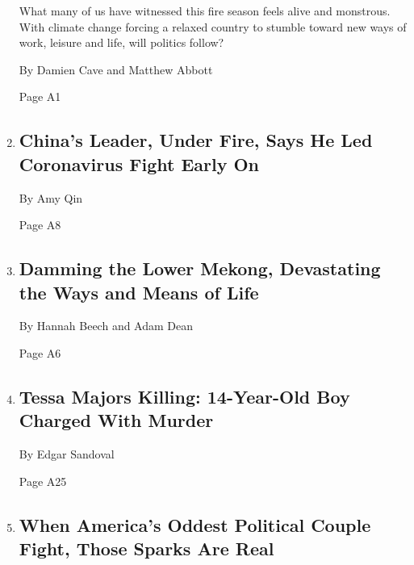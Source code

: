 \begin{enumerate}
  What many of us have witnessed this fire season feels alive and
  monstrous. With climate change forcing a relaxed country to stumble
  toward new ways of work, leisure and life, will politics follow?

  By Damien Cave and Matthew Abbott

  Page A1
\item
  \href{/2020/02/15/world/asia/xi-china-coronavirus.html}{}

  \hypertarget{chinas-leader-under-fire-says-he-led-coronavirus-fight-early-on}{%
  \subsection{China's Leader, Under Fire, Says He Led Coronavirus Fight
  Early
  On}\label{chinas-leader-under-fire-says-he-led-coronavirus-fight-early-on}}

  By Amy Qin

  Page A8
\item
  \href{/2020/02/15/world/asia/mekong-river-dams-thailand.html}{}

  \hypertarget{damming-the-lower-mekong-devastating-the-ways-and-means-of-life}{%
  \subsection{Damming the Lower Mekong, Devastating the Ways and Means
  of
  Life}\label{damming-the-lower-mekong-devastating-the-ways-and-means-of-life}}

  By Hannah Beech and Adam Dean

  Page A6
\item
  \href{/2020/02/15/nyregion/tessa-majors-barnard-arrest.html}{}

  \hypertarget{tessa-majors-killing-14-year-old-boy-charged-with-murder}{%
  \subsection{Tessa Majors Killing: 14-Year-Old Boy Charged With
  Murder}\label{tessa-majors-killing-14-year-old-boy-charged-with-murder}}

  By Edgar Sandoval

  Page A25
\item
  \href{/2020/02/14/us/politics/george-and-kellyanne-conway.html}{}

  \hypertarget{when-americas-oddest-political-couple-fight-those-sparks-are-real}{%
  \subsection{When America's Oddest Political Couple Fight, Those Sparks
  Are
  Real}\label{when-americas-oddest-political-couple-fight-those-sparks-are-real}}


\end{enumerate}
